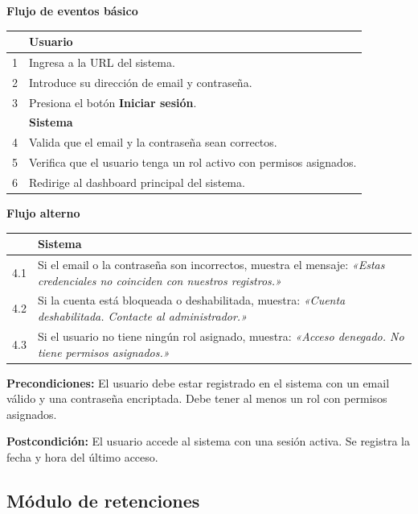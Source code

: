 \documentclass[stu]{apa7}
\begin{document}
\vspace{0.3cm}

\textbf{Flujo de eventos básico}

\begin{tabularx}{\textwidth}{|c|X|}
\hline
& \textbf{Usuario} \\
\hline
1 & Ingresa a la URL del sistema. \\
\hline
2 & Introduce su dirección de email y contraseña. \\
\hline
3 & Presiona el botón \textbf{Iniciar sesión}. \\
\hline
& \textbf{Sistema} \\
\hline
4 & Valida que el email y la contraseña sean correctos. \\
\hline
5 & Verifica que el usuario tenga un rol activo con permisos asignados. \\
\hline
6 & Redirige al dashboard principal del sistema. \\
\hline
\end{tabularx}

\vspace{0.3cm}

\textbf{Flujo alterno}

\begin{tabularx}{\textwidth}{|c|X|}
\hline
& \textbf{Sistema} \\
\hline
4.1 & Si el email o la contraseña son incorrectos, muestra el mensaje: \textit{«Estas credenciales no coinciden con nuestros registros.»} \\
\hline
4.2 & Si la cuenta está bloqueada o deshabilitada, muestra: \textit{«Cuenta deshabilitada. Contacte al administrador.»} \\
\hline
4.3 & Si el usuario no tiene ningún rol asignado, muestra: \textit{«Acceso denegado. No tiene permisos asignados.»} \\
\hline
\end{tabularx}

\vspace{0.3cm}

\textbf{Precondiciones:} El usuario debe estar registrado en el sistema con un email válido y una contraseña encriptada. Debe tener al menos un rol con permisos asignados.

\textbf{Postcondición:} El usuario accede al sistema con una sesión activa. Se registra la fecha y hora del último acceso.

\newpage

\subsection{Módulo de retenciones}
\end{document}
